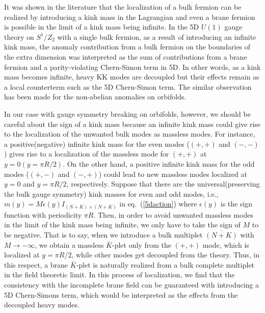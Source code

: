 \documentclass[a4paper,12pt]{article}
\begin{document}
It was shown in the literature that the localization of a bulk fermion 
can be realized by introducing a kink mass in the Lagrangian and 
even a brane fermion is possible in the limit of a kink mass being 
infinite\cite{ah}. 
In the 5D $U(1)$ gauge theory on $S^1/Z_2$ with a single bulk fermion, 
as a result of introducing an infinite kink mass,
the anomaly contribution from a bulk fermion on the boundaries of the extra
dimension was interpreted as the sum 
of contributions from a brane fermion and a parity-violating 
Chern-Simon term in 5D\cite{ah}. 
In other words, as a kink mass becomes infinite, 
heavy KK modes are decoupled but their effects remain as a local counterterm
such as the 5D Chern-Simon term. The similar observation has been made
for the non-abelian anomalies on orbifolds\cite{kkl}. 

In our case with gauge symmetry breaking on orbifolds, however,
we should be careful about the sign of a kink mass because an infinite kink 
mass could give rise to the localization of the unwanted bulk modes 
as massless modes\cite{barbieri,pomarol,hebecker}. For instance, 
a positive(negative) infinite kink mass for the even modes 
($(+,+)$ and $(-,-)$) 
gives rise to a localization of the massless mode for $(+,+)$ 
at $y=0(y=\pi R/2)$. 
On the other hand, 
a positive infinite kink mass for the odd modes ($(+,-)$ and $(-,+)$) 
could lead to new massless modes localized at $y=0$ and $y=\pi R/2$, 
respectively. 
Suppose that there are the universal(preserving the bulk gauge symmetry) 
kink masses for even and odd modes, i.e., 
$m(y)=M\epsilon(y)I_{(N+K)\times (N+K)}$ in eq.~(\ref{5daction}) 
where $\epsilon(y)$ is the sign function with periodicity $\pi R$. 
Then, in order to avoid unwanted massless modes in the limit of the kink mass 
being infinite, we only have to take the sign of $M$ to be negative. 
That is to say, when we introduce a bulk multiplet $\overline{(N+K)}$ 
with $M\rightarrow -\infty$, 
we obtain a massless $\bar K$-plet only from the $(+,+)$ mode, 
which is localized at $y=\pi R/2$, while other modes get decoupled 
from the theory. 
Thus, in this respect, a brane $\bar K$-plet is naturally realized from a bulk 
complete multiplet in the field theoretic limit. 
In this process of localization, we find that 
the consistency with the incomplete brane field can be guaranteed 
with introducing a 5D Chern-Simons term\cite{kkl}, 
which would be interpreted as the 
effects from the decoupled heavy modes\cite{ch,ah,pilo}. 
\end{document}
